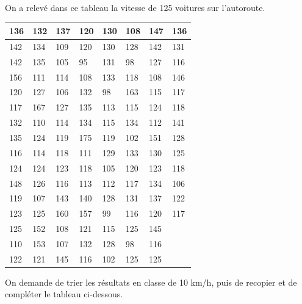 \begin{exercice}
On a relevé dans ce tableau la vitesse de 125 voitures sur l'autoroute.

\begin{tabular}{|l|l|l|l|l|l|l|l}
\hline
136 & 132 & 137 & 120 & 130 & 108 & 147 & \multicolumn{1}{l|}{136} \\ \hline
142 & 134 & 109 & 120 & 130 & 128 & 142 & \multicolumn{1}{l|}{131} \\ \hline
142 & 135 & 105 & 95  & 131 & 98  & 127 & \multicolumn{1}{l|}{116} \\ \hline
156 & 111 & 114 & 108 & 133 & 118 & 108 & \multicolumn{1}{l|}{146} \\ \hline
120 & 127 & 106 & 132 & 98  & 163 & 115 & \multicolumn{1}{l|}{117} \\ \hline
117 & 167 & 127 & 135 & 113 & 115 & 124 & \multicolumn{1}{l|}{118} \\ \hline
132 & 110 & 114 & 134 & 115 & 134 & 112 & \multicolumn{1}{l|}{141} \\ \hline
135 & 124 & 119 & 175 & 119 & 102 & 151 & \multicolumn{1}{l|}{128} \\ \hline
116 & 114 & 118 & 111 & 129 & 133 & 130 & \multicolumn{1}{l|}{125} \\ \hline
124 & 124 & 123 & 118 & 105 & 120 & 123 & \multicolumn{1}{l|}{118} \\ \hline
148 & 126 & 116 & 113 & 112 & 117 & 134 & \multicolumn{1}{l|}{106} \\ \hline
119 & 107 & 143 & 140 & 128 & 131 & 137 & \multicolumn{1}{l|}{122} \\ \hline
123 & 125 & 160 & 157 & 99  & 116 & 120 & \multicolumn{1}{l|}{117} \\ \hline
125 & 152 & 108 & 121 & 115 & 125 & 145 &                          \\ \cline{1-7}
110 & 153 & 107 & 132 & 128 & 98  & 116 &                          \\ \cline{1-7}
122 & 121 & 145 & 116 & 102 & 125 & 125 &                          \\ \cline{1-7}
\end{tabular}

On demande de trier les résultats en classe de 10 km/h, puis de recopier et de compléter le tableau ci-dessous.

\begin{landscape}


\end{landscape}
\end{exercice}
